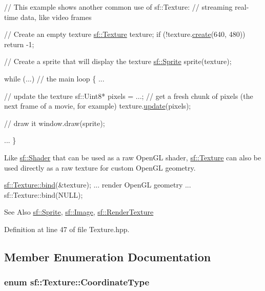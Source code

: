 \begin{DoxyCode}
\textcolor{comment}{// This example shows another common use of sf::Texture:}
\textcolor{comment}{// streaming real-time data, like video frames}

\textcolor{comment}{// Create an empty texture}
\hyperlink{classsf_1_1Texture}{sf::Texture} texture;
\textcolor{keywordflow}{if} (!texture.\hyperlink{classsf_1_1Texture_a89b4c7d204acf1033c3a1b6e0a3ad0a3}{create}(640, 480))
    \textcolor{keywordflow}{return} -1;

\textcolor{comment}{// Create a sprite that will display the texture}
\hyperlink{classsf_1_1Sprite}{sf::Sprite} sprite(texture);

\textcolor{keywordflow}{while} (...) \textcolor{comment}{// the main loop}
\{
    ...

    \textcolor{comment}{// update the texture}
    sf::Uint8* pixels = ...; \textcolor{comment}{// get a fresh chunk of pixels (the next frame of a movie, for example)}
    texture.\hyperlink{classsf_1_1Texture_ae4eab5c6781316840b0c50ad08370963}{update}(pixels);

    \textcolor{comment}{// draw it}
    window.draw(sprite);

    ...
\}
\end{DoxyCode}


Like \hyperlink{classsf_1_1Shader}{sf\-::\-Shader} that can be used as a raw Open\-G\-L shader, \hyperlink{classsf_1_1Texture}{sf\-::\-Texture} can also be used directly as a raw texture for custom Open\-G\-L geometry. 
\begin{DoxyCode}
\hyperlink{classsf_1_1Texture_ae9a4274e7b95ebf7244d09c7445833b0}{sf::Texture::bind}(&texture);
... render OpenGL geometry ...
sf::Texture::bind(NULL);
\end{DoxyCode}


\begin{DoxySeeAlso}{See Also}
\hyperlink{classsf_1_1Sprite}{sf\-::\-Sprite}, \hyperlink{classsf_1_1Image}{sf\-::\-Image}, \hyperlink{classsf_1_1RenderTexture}{sf\-::\-Render\-Texture} 
\end{DoxySeeAlso}


Definition at line 47 of file Texture.\-hpp.



\subsection{Member Enumeration Documentation}
\hypertarget{classsf_1_1Texture_aa6fd3bbe3c334b3c4428edfb2765a82e}{
\subsubsection[{Coordinate\-Type}]{\setlength{\rightskip}{0pt plus 5cm}enum {\bf sf\-::\-Texture\-::\-Coordinate\-Type}}}\label{classsf_1_1Texture_aa6fd3bbe3c334b3c4428edfb2765a82e}


